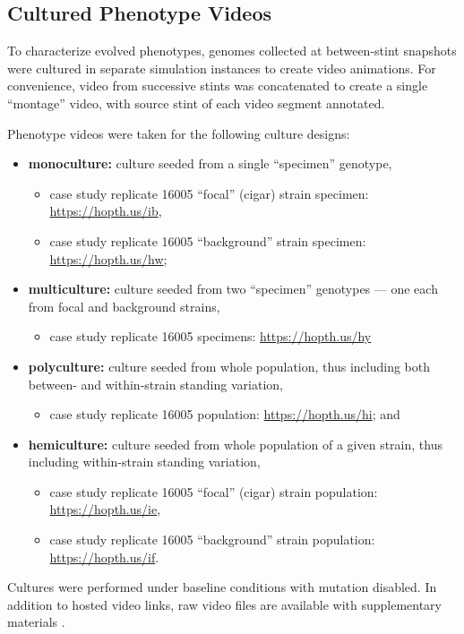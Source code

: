 \subsection{Cultured Phenotype Videos}
\label{sec:cultured-phenotype-videos}

To characterize evolved phenotypes, genomes collected at between-stint snapshots were cultured in separate simulation instances to create video animations.
For convenience, video from successive stints was concatenated to create a single ``montage'' video, with source stint of each video segment annotated.

Phenotype videos were taken for the following culture designs:
\begin{itemize}
\item \textbf{monoculture:} culture seeded from a single ``specimen'' genotype,
  \begin{itemize}
  \item case study replicate 16005 ``focal'' (cigar) strain specimen: \url{https://hopth.us/ib},
  \item case study replicate 16005 ``background'' strain specimen: \url{https://hopth.us/hw};
  \end{itemize}
\item \textbf{multiculture:} culture seeded from two ``specimen'' genotypes --- one each from focal and background strains,
  \begin{itemize}
  \item case study replicate 16005 specimens: \url{https://hopth.us/hy}
  \end{itemize}
\item \textbf{polyculture:} culture seeded from whole population, thus including both between- and within-strain standing variation,
  \begin{itemize}
  \item case study replicate 16005 population: \url{https://hopth.us/hi}; and
  \end{itemize}
\item \textbf{hemiculture:} culture seeded from whole population of a given strain, thus including within-strain standing variation,
  \begin{itemize}
  \item case study replicate 16005 ``focal'' (cigar) strain population: \url{https://hopth.us/ie},
  \item case study replicate 16005 ``background'' strain population: \url{https://hopth.us/if}.
  \end{itemize}
\end{itemize}

Cultures were performed under baseline conditions with mutation disabled.
In addition to hosted video links, raw video files are available with supplementary materials \citep{moreno2026osf,foster2017open}.
